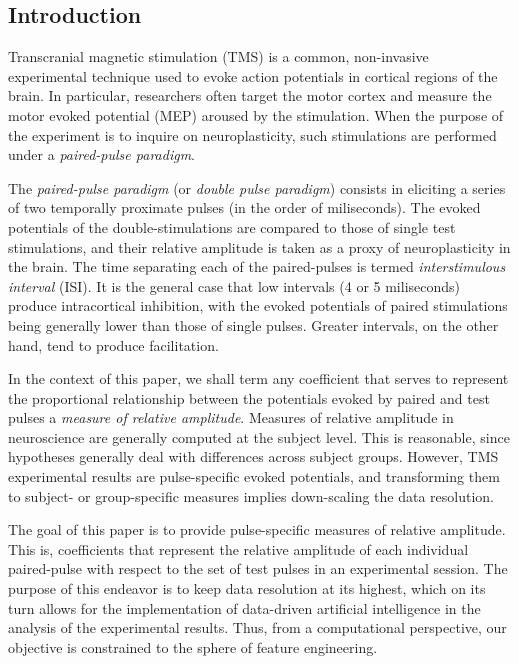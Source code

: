 \documentclass{article}
\begin{document}
 

\begin{multicols}{2}
\section{Introduction}
\newtheorem{definition}{Definition}
\newtheorem{remark}{Remark}

Transcranial magnetic stimulation (TMS) is a common,
non-invasive experimental technique used to evoke action
potentials in cortical regions of the brain. In particular,
researchers often target the motor cortex and measure the
motor evoked potential (MEP) aroused by the stimulation.
When the purpose of the experiment is to inquire on
neuroplasticity, such stimulations are performed under a
\textit{paired-pulse paradigm}.

The \textit{paired-pulse paradigm} (or \textit{double pulse
paradigm}) consists in eliciting a series of two temporally
proximate pulses (in the order of miliseconds). The evoked
potentials of the double-stimulations are compared to those
of single test stimulations, and their relative amplitude is
taken as a proxy of neuroplasticity in the brain. The time
separating each of the paired-pulses is termed
\textit{interstimulous interval} (ISI). It is the general
case that low intervals (4 or 5 miliseconds) produce
intracortical inhibition, with the evoked potentials of
paired stimulations being generally lower than those of
single pulses. Greater intervals, on the other hand, tend to
produce facilitation. 


In the context of this paper, we shall term any coefficient
that serves to represent the proportional relationship
between the potentials evoked by paired and test pulses a
\textit{measure of relative amplitude}. Measures of relative
amplitude in neuroscience are generally computed at the
subject level. This is reasonable, since hypotheses
generally deal with differences across subject groups.
However, TMS experimental results are pulse-specific evoked
potentials, and transforming them to subject- or
group-specific measures implies down-scaling the data resolution. 

The goal of this paper is to provide pulse-specific measures of relative
amplitude. This is, coefficients that represent the relative amplitude of each
individual paired-pulse with respect to the set of test pulses in an
experimental session. The purpose of this endeavor is to keep data resolution
at its highest, which on its turn allows for the implementation of data-driven
artificial intelligence in the analysis of the 
experimental results. Thus, from a computational perspective, our objective is
constrained to the sphere of feature engineering. 


\end{multicols}
\end{document}
